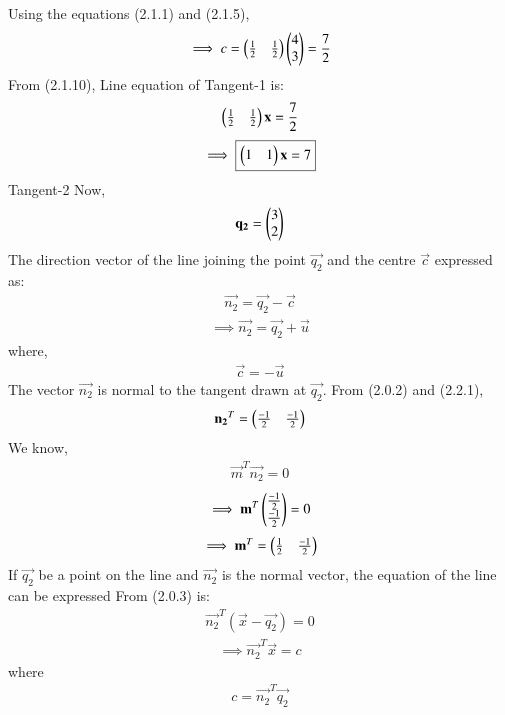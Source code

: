 Using the equations (2.1.1) and (2.1.5),
\begin{align}
 \implies c=\begin{pmatrix}\frac{1}{2} & \frac{1}{2}\end{pmatrix} \begin{pmatrix}4\\3\end{pmatrix}= \frac{7}{2}
\end{align}
From (2.1.10), Line equation of Tangent-1 is:
\begin{align}
 \begin{pmatrix}\frac{1}{2} & \frac{1}{2}\end{pmatrix} \mathbf{x}= \frac{7}{2}
\end{align}
\begin{align}
  \implies \boxed{\begin{pmatrix}1 & 1\end{pmatrix} \mathbf{x}= 7}
\end{align}
{Tangent-2} Now,
\begin{align}
\mathbf{q_2}=\begin{pmatrix}3\\2\end{pmatrix}
\end{align}
The direction vector of the line joining the point $\vec{q_2}$ and the centre $\vec{c}$ expressed as:
\begin{align}
 \vec{n_2}=\vec{q_2}-\vec{c}
 \end{align}
 \begin{align}
 \implies \vec{n_2}=\vec{q_2}+\vec{u}
 \end{align}
 where, 
\begin{align}
\vec{c}=-\vec{u} 
\end{align}
The vector $\vec{n_2}$ is normal to the tangent drawn at $\vec{q_2}$.
From (2.0.2) and (2.2.1),
\begin{align}
\mathbf{n_2}^T=\begin{pmatrix}\frac{-1}{2} & \frac{-1}{2}\end{pmatrix}
\end{align}
We know,
\begin{align}
\vec{m}^T\vec{n_2} = 0
\end{align}
\begin{align}
\implies \mathbf{m}^T\begin{pmatrix}\frac{-1}{2}\\ \frac{-1}{2}\end{pmatrix} = 0
\end{align}
\begin{align}
\implies \mathbf{m}^T= \begin{pmatrix}\frac{1}{2} & \frac{-1}{2}\end{pmatrix}
\end{align}
If $\vec{q_2}$ be a point on the line and $\vec{n_2}$ is the normal vector, the equation of the line can be expressed From (2.0.3) is:
\begin{align}
 \vec{n_2}^T (\vec{x}-\vec{q_2})=0
\end{align}
\begin{align}
 \implies \vec{n_2}^T \vec{x}= c
\end{align}
where
\begin{align}
 c=\vec{n_2}^T \vec{q_2}
\end{align}
